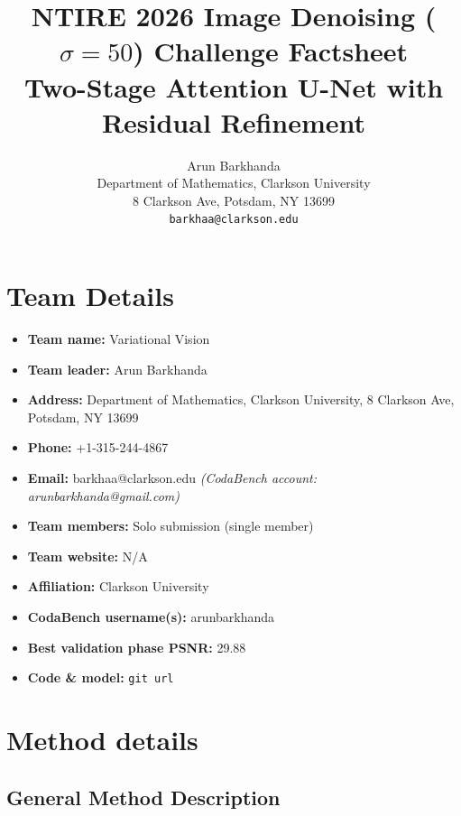 \documentclass[10pt,twocolumn,letterpaper]{article}
\begin{document}
\title{NTIRE 2026 Image Denoising ($\sigma=50$) Challenge Factsheet\\
Two-Stage Attention U-Net with Residual Refinement}

\author{
Arun Barkhanda\\
Department of Mathematics, Clarkson University\\
8 Clarkson Ave, Potsdam, NY 13699\\
{\tt\small barkhaa@clarkson.edu}
}
\maketitle

\section{Team Details}
\begin{itemize}
  \item \textbf{Team name:} Variational Vision
  \item \textbf{Team leader:} Arun Barkhanda
  \item \textbf{Address:} Department of Mathematics, Clarkson University, 8 Clarkson Ave, Potsdam, NY 13699
  \item \textbf{Phone:} +1-315-244-4867
  \item \textbf{Email:} barkhaa@clarkson.edu \textit{(CodaBench account: arunbarkhanda@gmail.com)}
  \item \textbf{Team members:} Solo submission (single member)
  \item \textbf{Team website:} N/A
  \item \textbf{Affiliation:} Clarkson University
  \item \textbf{CodaBench username(s):} arunbarkhanda
  \item \textbf{Best validation phase PSNR:} 29.88
  \item \textbf{Code \& model:} \texttt{git url}
\end{itemize}

\section{Method details}

\subsection{General Method Description}
\end{document}
